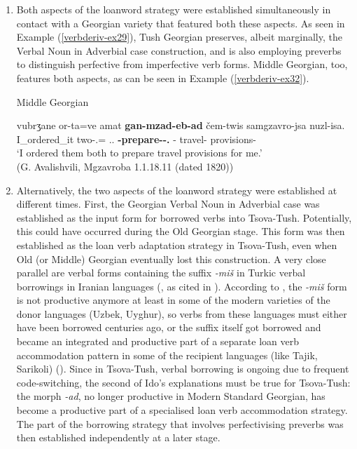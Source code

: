 \begin{enumerate}
	\item Both aspects of the loanword strategy were established simultaneously in contact with a Georgian variety that featured both these aspects. As seen in Example (\ref{verbderiv-ex29}), Tush Georgian preserves, albeit marginally, the Verbal Noun in Adverbial case construction, and is also employing preverbs to distinguish perfective from imperfective verb forms. Middle Georgian, too, features both aspects, as can be seen in Example (\ref{verbderiv-ex32}).
	
	
		\begin{exe}
			\ex\label{verbderiv-ex32}
			Middle Georgian
            
			\gll   vubrʒane or-ta=ve amat \textbf{gan-mzad-eb-ad} čem-twis samgzavro-jsa nuzl-isa. \\
			I\_ordered\_it two-{\Obl}.{\Pl}={\Emph} {\Prox}.{\Obl}.{\Pl} \textbf{{\Pv}-prepare-{\Tm}-{\Vn}.{\Advb}} {\Fsg}-{\Ben} travel-{\Gen} provisions-{\Gen}	\\
			\trans `I ordered them both to prepare travel provisions for me.' \\
			\hfill (G. Avalishvili, Mgzavroba 1.1.18.11 (dated 1820))
		\end{exe}
	
	
	\item  Alternatively, the two aspects of the loanword strategy were established at different times. First, the Georgian Verbal Noun in Adverbial case was established as the input form for borrowed verbs into Tsova-Tush. Potentially, this could have occurred during the Old Georgian stage. This form was then established as the loan verb adaptation strategy in Tsova-Tush, even when Old (or Middle) Georgian eventually lost this construction. A very close parallel are verbal forms containing the suffix \textit{-miš} in Turkic verbal borrowings in Iranian languages (\cites[]{ido06}, as cited in \cites[112]{wohlgemut09loanverbtyp}). According to \citeauthor{ido06}, the \textit{-miš} form is not productive anymore at least in some of the modern varieties of the donor languages (Uzbek, Uyghur), so verbs from these languages must either have been borrowed centuries ago, or the suffix itself got borrowed and became an integrated and productive part of a separate loan verb accommodation pattern in some of the recipient languages (like Tajik, Sarikoli) (\cites[112]{wohlgemut09loanverbtyp}). Since in Tsova-Tush, verbal borrowing is ongoing due to frequent code-switching, the second of Ido's explanations must be true for Tsova-Tush: the morph \textit{-ad}, no longer productive in Modern Standard Georgian, has become a productive part of a specialised loan verb accommodation strategy. The part of the borrowing strategy that involves perfectivising preverbs was then established independently at a later stage.
	
\end{enumerate}

